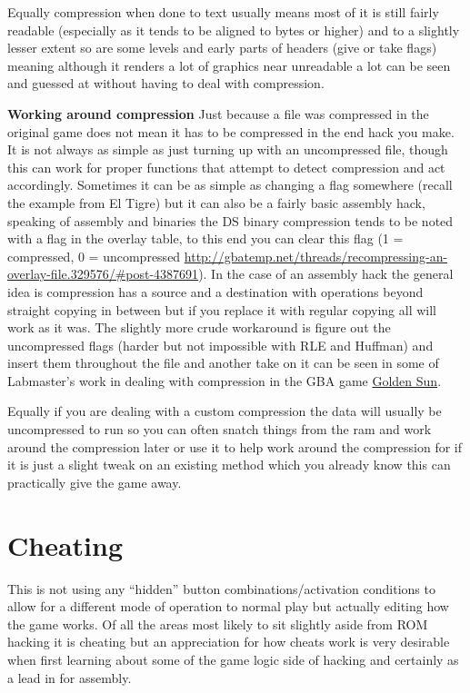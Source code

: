 \documentclass[
]{book}
\begin{document}
Equally compression when done to text usually means most of it is still fairly readable (especially as it tends to be aligned to bytes or higher) and to a slightly lesser extent so are some levels and early parts of headers (give or take flags) meaning although it renders a lot of graphics near unreadable a lot can be seen and guessed at without having to deal with compression.

\textbf{Working around compression} Just because a file was compressed in the original game does not mean it has to be compressed in the end hack you make. It is not always as simple as just turning up with an uncompressed file, though this can work for proper functions that attempt to detect compression and act accordingly. Sometimes it can be as simple as changing a flag somewhere (recall the example from El Tigre) but it can also be a fairly basic assembly hack, speaking of assembly and binaries the DS binary compression tends to be noted with a flag in the overlay table, to this end you can clear this flag (1 = compressed, 0 = uncompressed \url{http://gbatemp.net/threads/recompressing-an-overlay-file.329576/\#post-4387691}). In the case of an assembly hack the general idea is compression has a source and a destination with operations beyond straight copying in between but if you replace it with regular copying all will work as it was. The slightly more crude workaround is figure out the uncompressed flags (harder but not impossible with RLE and Huffman) and insert them throughout the file and another take on it can be seen in some of Labmaster's work in dealing with compression in the GBA game \href{http://www.romhacking.net/documents/253/}{Golden Sun}.

Equally if you are dealing with a custom compression the data will usually be uncompressed to run so you can often snatch things from the ram and work around the compression later or use it to help work around the compression for if it is just a slight tweak on an existing method which you already know this can practically give the game away.

\hypertarget{cheating}{%
\section{Cheating}\label{cheating}}

This is not using any ``hidden'' button combinations/activation conditions to allow for a different mode of operation to normal play but actually editing how the game works. Of all the areas most likely to sit slightly aside from ROM hacking it is cheating but an appreciation for how cheats work is very desirable when first learning about some of the game logic side of hacking and certainly as a lead in for assembly.
\end{document}
